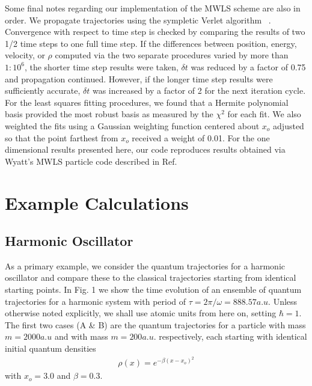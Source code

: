 Some final notes regarding our implementation of the MWLS scheme are 
also in order.  We propagate trajectories using the sympletic Verlet 
algorithm ~\cite{ref22}.  Convergence with respect to time step is checked by 
comparing the results of two 1/2 time steps to one full time step.  If 
the differences between position, energy, velocity, or $\rho$
computed via the two separate procedures varied by more than 
$1:10^6$, the shorter time step results were taken, 
$\delta t$ was reduced by a factor of 0.75 and propagation 
continued.  However, if the longer time step results were sufficiently 
accurate, $\delta t$ was increased by a factor of 2 for the next 
iteration cycle.  For the least squares fitting procedures, we found 
that a Hermite polynomial basis provided the most robust basis as 
measured by the $\chi^2$ for each fit.  We also 
weighted the fits using a Gaussian weighting function centered about 
$x_o$ adjusted so that the point farthest from 
$x_o$ received a weight of 0.01.  For the one 
dimensional results presented here, our code reproduces results 
obtained via Wyatt's MWLS particle code described in 
Ref.\cite{ref15}

\section{Example Calculations}
\subsection{Harmonic Oscillator}
As a primary example, we consider the quantum trajectories for a 
harmonic oscillator and compare these to the classical trajectories 
starting from identical starting points.  In Fig.  1 we show the time 
evolution of an ensemble of quantum trajectories for a harmonic system 
with period of $\tau= 2\pi/\omega= 888.57 a.u.$ 
Unless otherwise noted explicitly, we shall use atomic units from here 
on, setting $\hbar = 1$.  The first two cases (A \& B) are 
the quantum trajectories for a particle with mass $m=2000 a.u$
and with mass $m=200 a.u.$ respectively, 
each starting with identical initial quantum densities 
\begin{eqnarray}
\rho(x) =e^{-\beta (x-{x_o})^2}    
\label{eq:rhoinit}
\end{eqnarray}
with $x_o=3.0$ and $\beta=0.3$.

